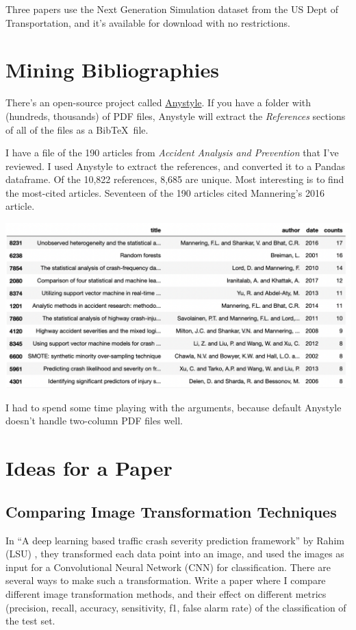 \documentclass[11pt]{article}
\begin{document}
\begin{spacing}{1.2}
Three papers use the Next Generation Simulation dataset from the US Dept of Transportation, and it's available for download with no restrictions.  

\section{Mining Bibliographies}

There's an open-source project called  \href{https://github.com/inukshuk/anystyle}{Anystyle}.  If you have a folder with (hundreds, thousands) of PDF files, Anystyle will extract the {\it References} sections of all of the files as a Bib\TeX \ file.  

I have a file of the 190 articles from {\it Accident Analysis and Prevention} that I've reviewed.  I used Anystyle to extract the  references, and converted it to a Pandas dataframe.  Of the 10,822 references, 8,685 are unique.  Most interesting is to find the most-cited articles.  Seventeen of the 190 articles cited Mannering's 2016 article.  

\includegraphics[width=\linewidth]{Screen Shot 2021-05-24 at 6.35.11 AM.png}

I had to spend some time playing with the arguments, because default Anystyle doesn't handle two-column PDF files well.

\section{Ideas for a Paper}

\subsection{Comparing Image Transformation Techniques}

In ``A deep learning based traffic crash severity prediction framework'' by Rahim (LSU) \cite{RAHIM2021106090}, they transformed each data point into an image, and used the images as input for a Convolutional Neural Network (CNN) for classification.  There are several ways to make such a transformation.  Write a paper where I compare different image transformation methods, and their effect on different metrics (precision, recall, accuracy, sensitivity, f1, false alarm rate) of the classification of the test set.  


\end{spacing}
\end{document}

